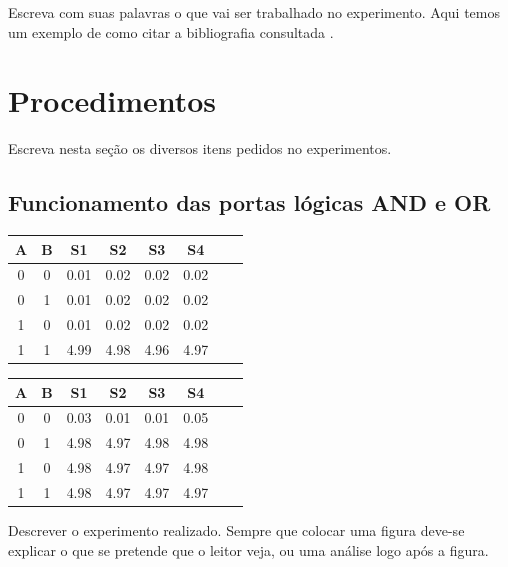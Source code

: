 \documentclass[12pt]{article}
\begin{document}
Escreva com suas palavras o que vai ser trabalhado no experimento. Aqui temos um exemplo de como citar a bibliografia consultada \cite{boulic:91} \cite{smith:99}.

\section{Procedimentos}
\label{sec:Procedimentos}

Escreva nesta seção os diversos itens pedidos no experimentos. 

\subsection{Funcionamento das portas lógicas AND e OR}
\label{sec:Porta Lógica}


\begin{table}
	\centering
	\begin{tabular}{|c|c|c|c|c|c|c|c|}
	\cline{1-6}
	\multicolumn{1}{|c|}{A} & \multicolumn{1}{|c|}{B} & \multicolumn{1}{|c|}{S1} & \multicolumn{1}{|c|}{S2} & \multicolumn{1}{|c|}{S3} & \multicolumn{1}{|c|}{S4}\\
	\hline
	0 & 0 & 0.01 & 0.02 & 0.02 & 0.02\\
	0 & 1 & 0.01 & 0.02 & 0.02 & 0.02\\
	1 & 0 & 0.01 & 0.02 & 0.02 & 0.02\\
	1 & 1 & 4.99 & 4.98 & 4.96 & 4.97\\
	\hline
	\end{tabular}
	\label{Porta AND}
\end{table}

\begin{table}
	\centering
	\begin{tabular}{|c|c|c|c|c|c|c|c|}
	\cline{1-6}
	\multicolumn{1}{|c|}{A} & \multicolumn{1}{|c|}{B} & \multicolumn{1}{|c|}{S1} & \multicolumn{1}{|c|}{S2} & \multicolumn{1}{|c|}{S3} & \multicolumn{1}{|c|}{S4}\\
	\hline
	0 & 0 & 0.03 & 0.01 & 0.01 & 0.05\\
	0 & 1 & 4.98 & 4.97 & 4.98 & 4.98\\
	1 & 0 & 4.98 & 4.97 & 4.97 & 4.98\\
	1 & 1 & 4.98 & 4.97 & 4.97 & 4.97\\
	\hline
	\end{tabular}
	\label{Porta OR}
\end{table}

Descrever o experimento realizado. Sempre  que colocar uma figura deve-se explicar o que se pretende que o leitor veja, ou uma análise logo após a figura. 
\end{document}
